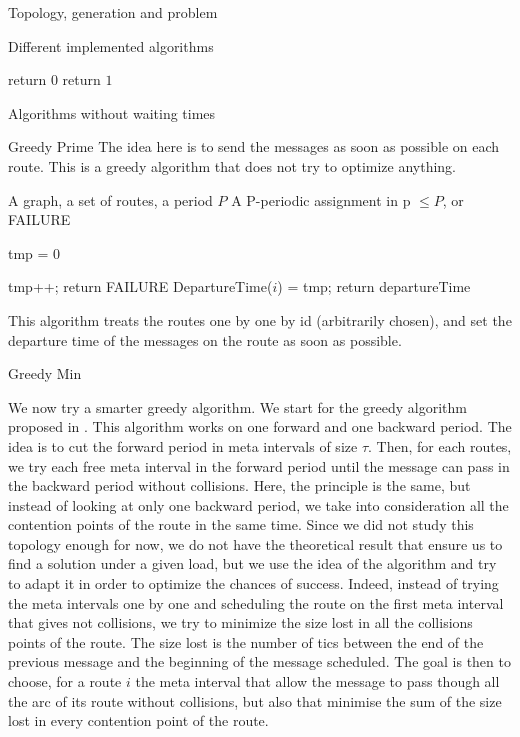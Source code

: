 \documentclass[10pt]{article}
\begin{document}
\begin{section}{Topology, generation and problem}
\begin{subsection}{Different implemented algorithms}
\begin{algorithm}[H]
\begin{algorithmic}
 	\STATE return $0$
 	\ENDIF
 	\ENDFOR
	\STATE return $1$
 	\end{algorithmic}
 	\end{algorithm}
  \begin{subsection}{Algorithms without waiting times}
  \begin{subsubsection}{Greedy Prime}
  The idea here is to send the messages as soon as possible on each route. This is a greedy algorithm that does not try to optimize anything.

   	\begin{algorithm}[H]
 	\caption{Greedy Prime}
 	\begin{algorithmic}
 	\REQUIRE A graph, a set of routes, a period $P$
	\ENSURE A P-periodic assignment in p $\leq P$, or FAILURE

	\STATE tmp = $0$
	
 	
 	\STATE tmp++;
	\STATE return FAILURE
	\ENDIF
 	\ENDWHILE
	\STATE DepartureTime($i$) = tmp;
 	\ENDFOR
	\STATE return departureTime
 	\end{algorithmic}
 	\end{algorithm}
	This algorithm treats the routes one by one by id (arbitrarily chosen), and set the departure time of the messages on the route as soon as possible.
  \end{subsubsection}
    \begin{subsubsection}{Greedy Min}
  
  We now try a smarter greedy algorithm. We start for the greedy algorithm proposed in \cite{Guir1806:Deterministic}.
  This algorithm works on one forward and one backward period. The idea is to cut the forward period in meta intervals of size $\tau$. Then, for each routes, we try each free meta interval in the forward period until the message can pass in the backward period without collisions. Here, the principle is the same, but instead of looking at only one backward period, we take into consideration all the contention points of the route in the same time. Since we did not study this topology enough for now, we do not have the theoretical result that ensure us to find a solution under a given load, but we use the idea of the algorithm and try to adapt it in order to optimize the chances of success. Indeed, instead of trying the meta intervals one by one and scheduling the route on the first meta interval that gives not collisions, we try to minimize the size lost in all the collisions points of the route.
 	The size lost is the number of tics between the end of the previous message and the beginning of the message scheduled.
	The goal is then to choose, for a route $i$ the meta interval that allow the message to pass though all the arc of its route without collisions, but also that minimise the sum of the size lost in every contention point of the route.
	

\end{subsubsection}
\end{subsection}
\end{subsection}
\end{section}
\end{document}
